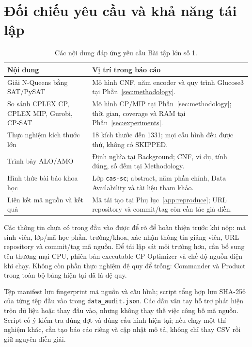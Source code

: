 \section{Đối chiếu yêu cầu và khả năng tái lập}
\begin{table}[pos=H]\centering\small
\caption{Các nội dung đáp ứng yêu cầu Bài tập lớn số 1.}
\begin{tabular}{@{}p{.40\linewidth}p{.53\linewidth}@{}}\toprule
Nội dung & Vị trí trong báo cáo\\\midrule
Giải N-Queens bằng SAT/PySAT & Mô hình CNF, năm encoder và quy trình Glucose3 tại Phần~\ref{sec:methodology}.\\
So sánh CPLEX CP, CPLEX MIP, Gurobi, CP-SAT & Mô hình CP/MIP tại Phần~\ref{sec:methodology}; thời gian, coverage và RAM tại Phần~\ref{sec:experiments}.\\
Thực nghiệm kích thước lớn & 18 kích thước đến 1331; mọi cấu hình đều được thử, không có SKIPPED.\\
Trình bày ALO/AMO & Định nghĩa tại Background; CNF, ví dụ, tính đúng, số đếm tại Methodology.\\
Hình thức bài báo khoa học & Lớp \texttt{cas-sc}; abstract, năm phần chính, Data Availability và tài liệu tham khảo.\\
Liên kết mã nguồn và kết quả & Mã tái tạo tại Phụ lục~\ref{app:reproduce}; URL repository và commit/tag còn cần tác giả điền.\\
\bottomrule\end{tabular}
\end{table}
Các thông tin chưa có trong đầu vào được để rõ để hoàn thiện trước khi nộp: mã sinh viên, lớp/mã học phần, trường/khoa, xác nhận thông tin giảng viên, URL repository và commit/tag mã nguồn. Để tái lập sát môi trường hơn, cần bổ sung tên thương mại CPU, phiên bản executable CP Optimizer và chế độ nguồn điện khi chạy. Không còn phần thực nghiệm đệ quy để trống: Commander và Product trong toàn bộ bảng hiện tại đã là đệ quy.

Tệp manifest lưu fingerprint mã nguồn và cấu hình; script tổng hợp lưu SHA-256 của từng tệp đầu vào trong \texttt{data\_audit.json}. Các dấu vân tay hỗ trợ phát hiện trộn dữ liệu hoặc thay đầu vào, nhưng không thay thế việc công bố mã nguồn. Script cố ý kiểm tra đúng đợt và đúng cấu hình hiện tại; nếu chạy một thí nghiệm khác, cần tạo báo cáo riêng và cập nhật mô tả, không chỉ thay CSV rồi giữ nguyên diễn giải.


\FloatBarrier
